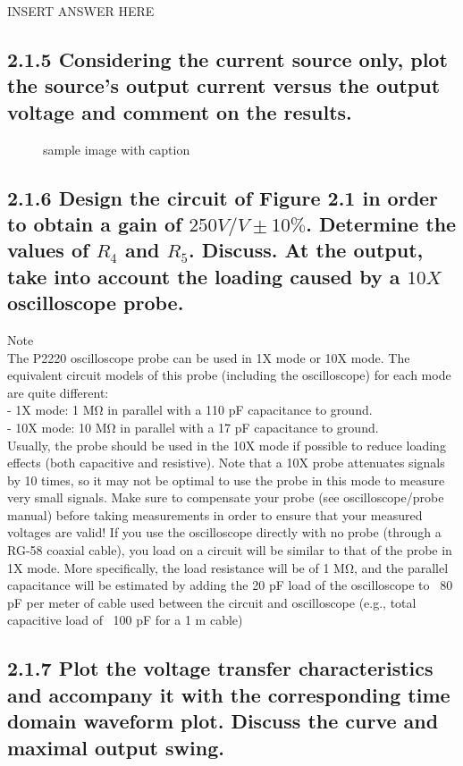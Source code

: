\documentclass[12pt]{article}
\begin{document}
INSERT ANSWER HERE

\subsection*{2.1.5 Considering the current source only, plot the source’s output current versus the output voltage and comment on the results.}

\begin{figure}[H]
  \centering
    \qquad
    \qquad
    \caption{sample image with caption}%
    \label{fig:testing}%
\end{figure}

\subsection*{2.1.6 Design the circuit of Figure 2.1 in order to obtain a gain of $250V/V ±10\%$. Determine the values of $R_4$ and $R_5$. Discuss. At the output, take into account the loading caused by a $10X$ oscilloscope probe.}

Note \\
The P2220 oscilloscope probe can be used in 1X mode or 10X mode. The equivalent circuit models of this probe (including the oscilloscope) for each mode are quite different:  \\
- 1X mode: 1 MΩ in parallel with a 110 pF capacitance to ground.  \\
- 10X mode: 10 MΩ in parallel with a 17 pF capacitance to ground.  \\ Usually, the probe should be used in the 10X mode if possible to reduce loading effects (both capacitive and resistive). Note that a 10X probe attenuates signals by 10 times, so it may not be optimal to use the probe in this mode to measure very small signals.   Make sure to compensate your probe (see oscilloscope/probe manual) before taking measurements in order to ensure that your measured voltages are valid! If you use the oscilloscope directly with no probe (through a RG-58 coaxial cable), you load on a circuit will be similar to that of the probe in 1X mode. More specifically, the load resistance will be of 1 MΩ, and the parallel capacitance will be estimated by adding the 20 pF load of the oscilloscope to ~80 pF per meter of cable used between the circuit and oscilloscope (e.g., total capacitive load of ~100 pF for a 1 m cable)

\subsection*{2.1.7 Plot the voltage transfer characteristics and accompany it with the corresponding time domain waveform plot. Discuss the curve and maximal output swing.}
\end{document}
